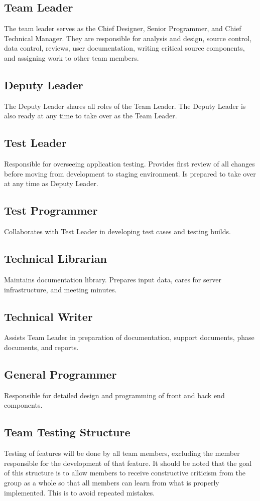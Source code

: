 \documentclass[14pt]{article}
\begin{document}
\subsection{Team Leader}
The team leader serves as the Chief Designer, Senior Programmer, and Chief Technical Manager. They are responsible for analysis and design, source control, data control, reviews, user documentation, writing critical source components, and assigning work to other team members.
\subsection{Deputy Leader}
The Deputy Leader shares all roles of the Team Leader. The Deputy Leader is also ready at any time to take  over as the Team  Leader.
\subsection{Test Leader}
Responsible for overseeing application testing. Provides first review of all changes before moving from development to staging environment. Is prepared to take over at any time as Deputy Leader.
\subsection{Test Programmer}
Collaborates with Test Leader in developing test cases and testing builds.
\subsection{Technical Librarian}
Maintains documentation library. Prepares input data, cares for server infrastructure, and meeting minutes.
\subsection{Technical Writer}
Assists Team Leader in preparation of documentation, support documents, phase documents, and reports.
\subsection{General Programmer}
Responsible for detailed design and programming of front and back end components.

\subsection{Team Testing Structure}
Testing of features will be done by all team members, excluding the member responsible for the development of that feature. It should be noted that the goal of this structure is to allow members to receive constructive criticism from the group as a whole so that all members can learn from what is properly implemented. This is to avoid repeated mistakes.
\end{document}
